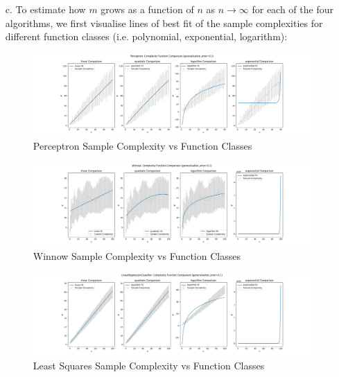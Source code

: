 \documentclass[12pt]{article}
\begin{document}
\begin{itemize}
\newpage
    \item[c.] To estimate how $m$ grows as a function of $n$ as $n \rightarrow \infty$ for each of the four algorithms, we first visualise lines of best fit of the sample complexities for different function classes (i.e. polynomial, exponential, logarithm):


    \begin{figure}[h]
    \centering
    \includegraphics[scale=0.3]{outputs/part3/q1a_perceptron_complexity_function_comparison.png}
    \caption{Perceptron Sample Complexity vs Function Classes}
    \label{fig:18}
    \end{figure}

    \begin{figure}[h]
    \centering
    \includegraphics[scale=0.3]{outputs/part3/q1a_winnow_complexity_function_comparison.png}
    \caption{Winnow Sample Complexity vs Function Classes}
    \label{fig:19}
    \end{figure}
    \begin{figure}[h]
    \centering
    \includegraphics[scale=0.3]{outputs/part3/q1a_lin_reg_complexity_function_comparison.png}
    \caption{Least Squares Sample Complexity vs Function Classes}
    \label{fig:21}
    \end{figure}
\newpage


\end{itemize}
\end{document}
